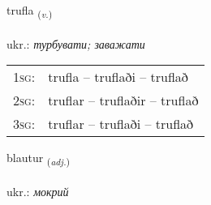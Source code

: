 \documentclass[frontgrid, backgrid]{flacards}\usepackage[]{graphicx}\usepackage[]{xcolor}
\begin{document}
\renewcommand{\flhead}{\vskip5pt \fboxsep=0pt {\small\bfseries\footnotesize Sagnorð | дієслово}}
\renewcommand{\fcfoot}{\vskip5pt \fboxsep=0pt \hspace{2pt}{\small\bfseries\footnotesize 3K}}

\renewcommand{\blhead}{\vskip5pt {\small\bfseries\footnotesize Sagnorð | дієслово }}
\renewcommand{\bcfoot}{\vskip5pt \hspace{2pt}{\small\bfseries\footnotesize 3K}}


{trufla \small{\textsubscript{(\textit{v.})}} \\[1ex] %
\textphonetic{[tʰrʏpla]} \\
ukr.: \emph{турбувати; заважати} \\  [2ex]
\renewcommand*{\arraystretch}{0.8}
\begin{tabular}{p{1cm}l}
\textsc{1sg}: & trufla -- truflaði -- truflað \\ 
\textsc{2sg}: & truflar -- truflaðir -- truflað \\ 
\textsc{3sg}: & truflar -- truflaði -- truflað \\ 
\end{tabular}
}

\renewcommand{\flhead}{\vskip5pt \fboxsep=0pt {\small\bfseries\footnotesize Lýsingarorð | прикметник}}
\renewcommand{\fcfoot}{\vskip5pt \fboxsep=0pt \hspace{2pt}{\small\bfseries\footnotesize 3K}}

\renewcommand{\blhead}{\vskip5pt {\small\bfseries\footnotesize Lýsingarorð | прикметник }}
\renewcommand{\bcfoot}{\vskip5pt \hspace{2pt}{\small\bfseries\footnotesize 3K}}


{blautur \small{\textsubscript{(\textit{adj.})}} \\[1ex] %
\textphonetic{[plœiːtʏr]} \\
ukr.: \emph{мокрий} \\  [2ex]
\renewcommand*{\arraystretch}{0.8}
}
\end{document}
